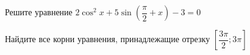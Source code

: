 \begin{ex}
	\begin{condition}
		\begin{enumcols}[label=\asbuk*)]
			\item Решите уравнение \( 2\cos^2 x + 5\sin {\left(\dfrac{\pi}{2}+x\right)} -3 = 0 \)
			\item Найдите все корни уравнения, принадлежащие отрезку \( \left[\dfrac{3\pi}{2};3\pi\right] \)
		\end{enumcols}
	\end{condition}
\end{ex}